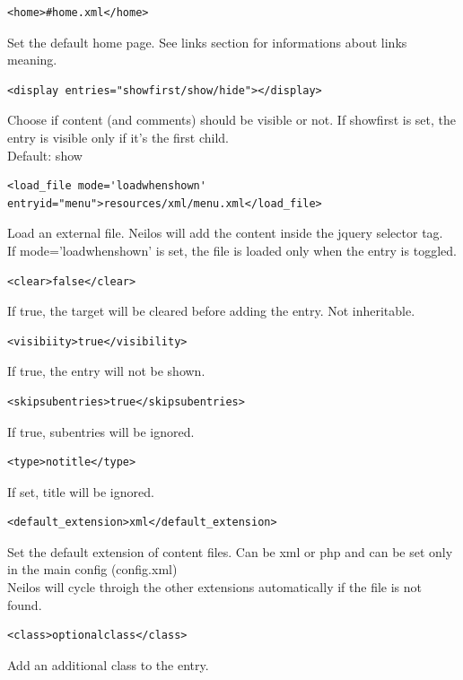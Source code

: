 \documentclass[a4paper,12pt]{article}
\begin{document}
\begin{list}{-}{}
\begin{verbatim}
<home>#home.xml</home>
      \end{verbatim}
Set the default home page. See links section for informations about links meaning.
\item \begin{verbatim}
<display entries="showfirst/show/hide"></display>
\end{verbatim}
Choose if content (and comments) should be visible or not. If showfirst is set, the entry is visible only if it's the first child.\\
Default: show
\item \begin{verbatim}
<load_file mode='loadwhenshown' 
entryid="menu">resources/xml/menu.xml</load_file>
      \end{verbatim}
Load an external file. Neilos will add the content inside the jquery selector tag.\\
If mode='loadwhenshown' is set, the file is loaded only when the entry is toggled.
\item \begin{verbatim}
<clear>false</clear>
\end{verbatim}
If true, the target will be cleared before adding the entry. Not inheritable.
\item \begin{verbatim}
<visibiity>true</visibility>
\end{verbatim}
If true, the entry will not be shown.
\item \begin{verbatim}
<skipsubentries>true</skipsubentries>
\end{verbatim}
If true, subentries will be ignored.
\item \begin{verbatim}
<type>notitle</type>
\end{verbatim}
If set, title will be ignored.
\item \begin{verbatim}
<default_extension>xml</default_extension>
\end{verbatim}
Set the default extension of content files. Can be xml or php and can be set only in the main config (config.xml)\\
Neilos will cycle throigh the other extensions automatically if the file is not found.
\item \begin{verbatim}
<class>optionalclass</class>
\end{verbatim}
Add an additional class to the entry.

\end{list}
\end{document}
